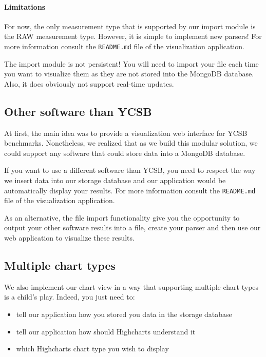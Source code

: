 \documentclass[a4paper,11pt]{report}
\begin{document}
\paragraph{Limitations}

For now, the only measurement type that is supported by our import module is the RAW measurement type. However, it is simple to implement new parsers! For more information consult the \texttt{README.md} file of the visualization application.

The import module is not persistent! You will need to import your file each time you want to visualize them as they are not stored into the MongoDB database.
Also, it does obviously not support real-time updates.

\subsection{Other software than YCSB}

At first, the main idea was to provide a visualization web interface for YCSB benchmarks. Nonetheless, we realized that as we build this modular solution, we could support any software that could store data into a MongoDB database.

If you want to use a different software than YCSB, you need to respect the way we insert data into our storage database and our application would be automatically display your results. For more information consult the \texttt{README.md} file of the visualization application.

As an alternative, the file import functionality give you the opportunity to output your other software results into a file, create your parser and then use our web application to visualize these results.

\subsection{Multiple chart types}

We also implement our chart view in a way that supporting multiple chart types is a child's play. Indeed, you just need to:

\begin{itemize}
\item
tell our application how you stored you data in the storage database
\item
tell our application how should Highcharts understand it
\item
which Highcharts chart type you wish to display
\end{itemize}
\end{document}
